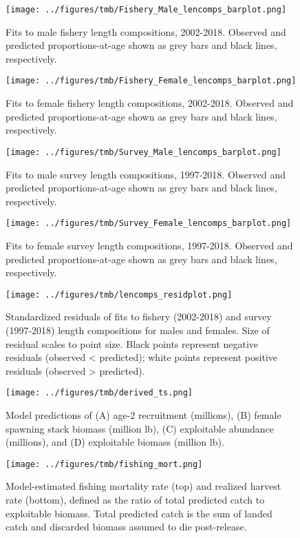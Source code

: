 \documentclass[]{article}
\begin{document}
\begin{figure}
\centering
\texttt{[image: ../figures/tmb/Fishery\_Male\_lencomps\_barplot.png]}
\caption{\label{fig:malefshlen}Fits to male fishery length compositions,
2002-2018. Observed and predicted proportions-at-age shown as grey bars
and black lines, respectively.}
\end{figure}

\begin{figure}
\centering
\texttt{[image: ../figures/tmb/Fishery\_Female\_lencomps\_barplot.png]}
\caption{\label{fig:femalefshlen}Fits to female fishery length compositions,
2002-2018. Observed and predicted proportions-at-age shown as grey bars
and black lines, respectively.}
\end{figure}

\begin{figure}
\centering
\texttt{[image: ../figures/tmb/Survey\_Male\_lencomps\_barplot.png]}
\caption{\label{fig:malesrvlen}Fits to male survey length compositions,
1997-2018. Observed and predicted proportions-at-age shown as grey bars
and black lines, respectively.}
\end{figure}

\begin{figure}
\centering
\texttt{[image: ../figures/tmb/Survey\_Female\_lencomps\_barplot.png]}
\caption{\label{fig:femalesrvlen}Fits to female survey length compositions,
1997-2018. Observed and predicted proportions-at-age shown as grey bars
and black lines, respectively.}
\end{figure}

\begin{figure}
\centering
\texttt{[image: ../figures/tmb/lencomps\_residplot.png]}
\caption{\label{fig:residlen}Standardized residuals of fits to fishery
(2002-2018) and survey (1997-2018) length compositions for males and
females. Size of residual scales to point size. Black points represent
negative residuals (observed \textless{} predicted); white points
represent positive residuals (observed \textgreater{} predicted).}
\end{figure}

\begin{figure}
\centering
\texttt{[image: ../figures/tmb/derived\_ts.png]}
\caption{\label{fig:derivedts}Model predictions of (A) age-2 recruitment
(millions), (B) female spawning stack biomass (million lb), (C)
exploitable abundance (millions), and (D) exploitable biomass (million
lb).}
\end{figure}

\begin{figure}
\centering
\texttt{[image: ../figures/tmb/fishing\_mort.png]}
\caption{\label{fig:fishmort}Model-estimated fishing mortality rate (top)
and realized harvest rate (bottom), defined as the ratio of total
predicted catch to exploitable biomass. Total predicted catch is the sum
of landed catch and discarded biomass assumed to die post-release.}
\end{figure}
\end{document}
